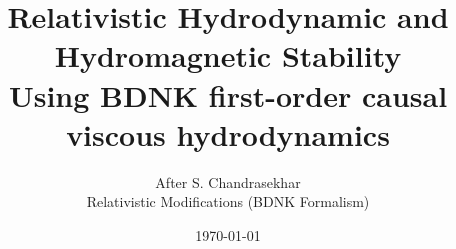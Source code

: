 \documentclass[12pt]{book}
\begin{document}
\title{Relativistic Hydrodynamic and Hydromagnetic Stability\\[0.5em]
\large Using BDNK first-order causal viscous hydrodynamics}
\author{After S. Chandrasekhar \\ Relativistic Modifications (BDNK Formalism)}
\date{\today}
\maketitle
\tableofcontents
\listoffigures



















































\end{document}
